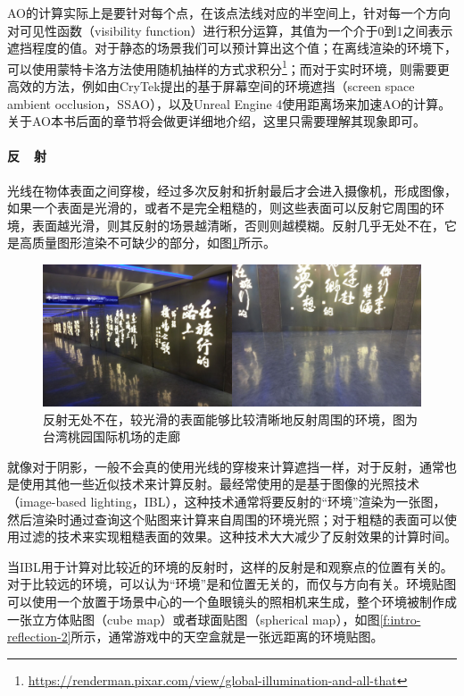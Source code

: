 AO的计算实际上是要针对每个点，在该点法线对应的半空间上，针对每一个方向对可见性函数（visibility function）进行积分运算，其值为一个介于0到1之间表示遮挡程度的值。对于静态的场景我们可以预计算出这个值；在离线渲染的环境下，可以使用蒙特卡洛方法使用随机抽样的方式求积分\footnote{\url{https://renderman.pixar.com/view/global-illumination-and-all-that}}；而对于实时环境，则需要更高效的方法，例如由CryTek提出的基于屏幕空间的环境遮挡（screen space ambient occlusion，SSAO），以及Unreal Engine 4使用距离场来加速AO的计算。关于AO本书后面的章节将会做更详细地介绍，这里只需要理解其现象即可。




\paragraph{反~~射}
光线在物体表面之间穿梭，经过多次反射和折射最后才会进入摄像机，形成图像，如果一个表面是光滑的，或者不是完全粗糙的，则这些表面可以反射它周围的环境，表面越光滑，则其反射的场景越清晰，否则则越模糊。反射几乎无处不在，它是高质量图形渲染不可缺少的部分，如图\ref{f:intro-reflection-1}所示。

\begin{figure}
\includegraphics[width=1.\textwidth]{figures/intro/reflection}	
\caption{反射无处不在，较光滑的表面能够比较清晰地反射周围的环境，图为台湾桃园国际机场的走廊}
\label{f:intro-reflection-1}
\end{figure}

就像对于阴影，一般不会真的使用光线的穿梭来计算遮挡一样，对于反射，通常也是使用其他一些近似技术来计算反射。最经常使用的是基于图像的光照技术（image-based lighting，IBL），这种技术通常将要反射的“环境”渲染为一张图，然后渲染时通过查询这个贴图来计算来自周围的环境光照；对于粗糙的表面可以使用过滤的技术来实现粗糙表面的效果。这种技术大大减少了反射效果的计算时间。

当IBL用于计算对比较近的环境的反射时，这样的反射是和观察点的位置有关的。对于比较远的环境，可以认为“环境”是和位置无关的，而仅与方向有关。环境贴图可以使用一个放置于场景中心的一个鱼眼镜头的照相机来生成，整个环境被制作成一张立方体贴图（cube map）或者球面贴图（spherical map），如图\ref{f:intro-reflection-2}所示，通常游戏中的天空盒就是一张远距离的环境贴图。

